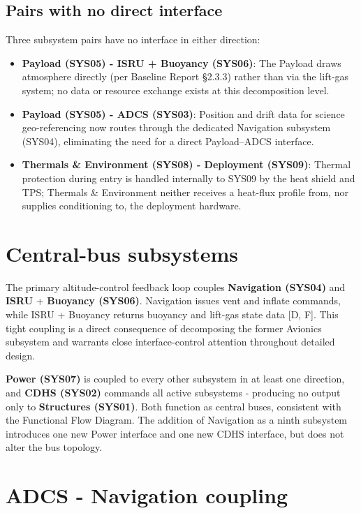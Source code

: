\subsection{Pairs with no direct interface}

Three subsystem pairs have no interface in either direction:

\begin{itemize}
    \item \textbf{Payload (SYS05) - ISRU + Buoyancy (SYS06)}: The Payload draws atmosphere directly (per Baseline Report §2.3.3) rather than via the lift-gas system; no data or resource exchange exists at this decomposition level.
    \item \textbf{Payload (SYS05) - ADCS (SYS03)}: Position and drift data for science geo-referencing now routes through the dedicated Navigation subsystem (SYS04), eliminating the need for a direct Payload–ADCS interface.
    \item \textbf{Thermals \& Environment (SYS08) - Deployment (SYS09)}: Thermal protection during entry is handled internally to SYS09 by the heat shield and TPS; Thermals \& Environment neither receives a heat-flux profile from, nor supplies conditioning to, the deployment hardware.
\end{itemize}

\section{Central-bus subsystems}

The primary altitude-control feedback loop couples \textbf{Navigation (SYS04)} and \textbf{ISRU} + \textbf{Buoyancy (SYS06)}. Navigation issues vent and inflate commands, while ISRU + Buoyancy returns buoyancy and lift-gas state data [D, F]. This tight coupling is a direct consequence of decomposing the former Avionics subsystem and warrants close interface-control attention throughout detailed design.


\textbf{Power (SYS07)} is coupled to every other subsystem in at least one direction, and \textbf{CDHS (SYS02)} commands all active subsystems - producing no output only to \textbf{Structures (SYS01)}. Both function as central buses, consistent with the Functional Flow Diagram. The addition of Navigation as a ninth subsystem introduces one new Power interface and one new CDHS interface, but does not alter the bus topology.

\section{ADCS - Navigation coupling}

